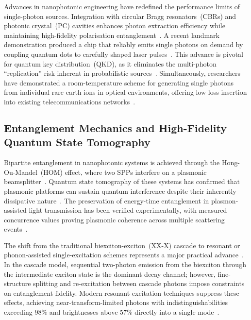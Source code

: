 \documentclass[twocolumn,10pt]{article}
\begin{document}
Advances in nanophotonic engineering have redefined the performance
limits of single-photon sources.  Integration with circular Bragg
resonators~(CBRs) and photonic crystal~(PC) cavities enhances photon
extraction efficiency while maintaining high-fidelity polarisation
entanglement~\cite{senellart2017high,lodahl2015interfacing}.  A recent
landmark demonstration produced a chip that reliably emits single photons
on demand by coupling quantum dots to carefully shaped laser
pulses~\cite{tomm2021bright}.  This advance is pivotal for quantum
key distribution~(QKD), as it eliminates the multi-photon
``replication'' risk inherent in probabilistic
sources~\cite{tomm2021bright}.
Simultaneously, researchers have demonstrated a room-temperature scheme
for generating single photons from individual rare-earth ions in optical
environments, offering low-loss insertion into existing
telecommunications networks~\cite{dibos2018atomic}.

\subsection{Entanglement Mechanics and High-Fidelity Quantum State
Tomography}

Bipartite entanglement in nanophotonic systems is achieved through the
Hong-Ou-Mandel~(HOM) effect, where two SPPs interfere on a plasmonic
beamsplitter~\cite{heeres2013quantum}.  Quantum state tomography of these
systems has confirmed that plasmonic platforms can sustain quantum
interference despite their inherently dissipative
nature~\cite{heeres2013quantum}.  The preservation of
energy-time entanglement in plasmon-assisted light transmission has
been verified experimentally, with measured concurrence values proving
plasmonic coherence across multiple scattering
events~\cite{fasel2005energy}.

The shift from the traditional biexciton-exciton~(XX-X) cascade to
resonant or phonon-assisted single-excitation schemes represents a
major practical advance~\cite{senellart2017high}.  In the cascade
model, sequential two-photon emission from the biexciton through the
intermediate exciton state is the dominant decay channel; however,
fine-structure splitting and re-excitation between cascade photons
impose constraints on entanglement fidelity.  Modern resonant
excitation techniques suppress these effects, achieving near-transform-limited
photons with indistinguishabilities exceeding 98\% and
brightnesses above 57\% directly into a single
mode~\cite{senellart2017high,lodahl2015interfacing}.
\end{document}
